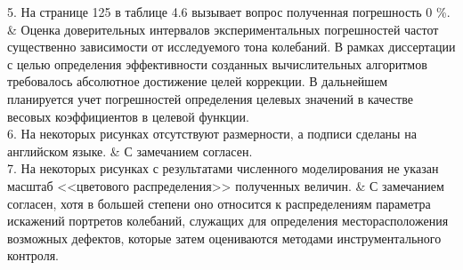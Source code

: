 \begin{frame}
	\vspace{0.5em}
	\begin{comtblr}{12em}
		5. На странице 125 в таблице 4.6 вызывает вопрос полученная погрешность $ 0 $ \%.
		&
		Оценка доверительных интервалов экспериментальных погрешностей частот существенно зависимости от исследуемого тона колебаний. В рамках диссертации с целью определения эффективности созданных вычислительных алгоритмов требовалось абсолютное достижение целей коррекции. В дальнейшем планируется учет погрешностей определения целевых значений в качестве весовых коэффициентов в целевой функции. \\
		6. На некоторых рисунках отсутствуют размерности, а подписи сделаны на английском языке.
		&
		С замечанием согласен. \\
		7. На некоторых рисунках с результатами численного моделирования не указан масштаб <<цветового распределения>> полученных величин.
		&
		С замечанием согласен, хотя в большей степени оно относится к распределениям параметра искажений портретов колебаний, служащих для определения месторасположения возможных дефектов, которые затем оцениваются методами инструментального контроля.
	\end{comtblr}
\end{frame}

\normalsize